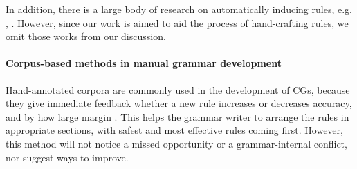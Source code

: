 In addition, there is a large body of research on automatically inducing rules, e.g. \cite{inducing_cg1996}, \cite{lindberg_eineborg98ilp}
. However, since our work is aimed to aid the process of hand-crafting rules, we omit those works from our discussion.


\paragraph{Corpus-based methods in manual grammar development}

Hand-annotated corpora are commonly used in the development of CGs, because they give immediate feedback whether a new rule increases or decreases accuracy, and by how large margin \cite{voutilainen2004}.
This helps the grammar writer to arrange the rules in appropriate sections, with safest and most effective rules coming first.
However, this method will not notice a missed opportunity or a grammar-internal conflict, nor suggest ways to improve.








